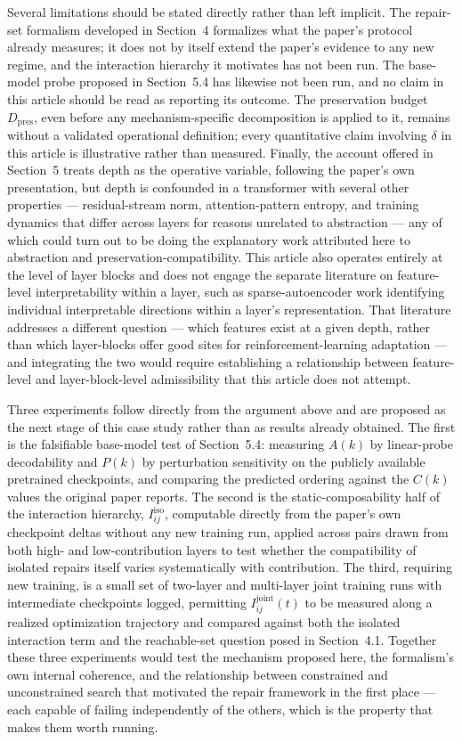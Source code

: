 \documentclass[11pt]{article}
\begin{document}
Several limitations should be stated directly rather than left implicit. The repair-set formalism developed in Section~4 formalizes what the paper's protocol already measures; it does not by itself extend the paper's evidence to any new regime, and the interaction hierarchy it motivates has not been run. The base-model probe proposed in Section~5.4 has likewise not been run, and no claim in this article should be read as reporting its outcome. The preservation budget $D_{\mathrm{pres}}$, even before any mechanism-specific decomposition is applied to it, remains without a validated operational definition; every quantitative claim involving $\delta$ in this article is illustrative rather than measured. Finally, the account offered in Section~5 treats depth as the operative variable, following the paper's own presentation, but depth is confounded in a transformer with several other properties --- residual-stream norm, attention-pattern entropy, and training dynamics that differ across layers for reasons unrelated to abstraction --- any of which could turn out to be doing the explanatory work attributed here to abstraction and preservation-compatibility. This article also operates entirely at the level of layer blocks and does not engage the separate literature on feature-level interpretability within a layer, such as sparse-autoencoder work identifying individual interpretable directions within a layer's representation. That literature addresses a different question --- which features exist at a given depth, rather than which layer-blocks offer good sites for reinforcement-learning adaptation --- and integrating the two would require establishing a relationship between feature-level and layer-block-level admissibility that this article does not attempt.

Three experiments follow directly from the argument above and are proposed as the next stage of this case study rather than as results already obtained. The first is the falsifiable base-model test of Section~5.4: measuring $A(k)$ by linear-probe decodability and $P(k)$ by perturbation sensitivity on the publicly available pretrained checkpoints, and comparing the predicted ordering against the $C(k)$ values the original paper reports. The second is the static-composability half of the interaction hierarchy, $I_{ij}^{\mathrm{iso}}$, computable directly from the paper's own checkpoint deltas without any new training run, applied across pairs drawn from both high- and low-contribution layers to test whether the compatibility of isolated repairs itself varies systematically with contribution. The third, requiring new training, is a small set of two-layer and multi-layer joint training runs with intermediate checkpoints logged, permitting $I_{ij}^{\mathrm{joint}}(t)$ to be measured along a realized optimization trajectory and compared against both the isolated interaction term and the reachable-set question posed in Section~4.1. Together these three experiments would test the mechanism proposed here, the formalism's own internal coherence, and the relationship between constrained and unconstrained search that motivated the repair framework in the first place --- each capable of failing independently of the others, which is the property that makes them worth running.
\end{document}
